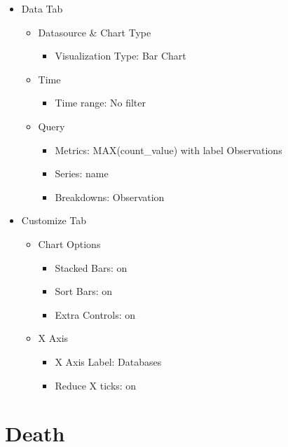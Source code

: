 \documentclass[
]{book}
\providecommand{\tightlist}{%
  \setlength{\itemsep}{0pt}\setlength{\parskip}{0pt}}
\begin{document}
\begin{itemize}
\item
  Data Tab

  \begin{itemize}
  \item
    Datasource \& Chart Type

    \begin{itemize}
    \tightlist
    \item
      Visualization Type: Bar Chart
    \end{itemize}
  \item
    Time

    \begin{itemize}
    \tightlist
    \item
      Time range: No filter
    \end{itemize}
  \item
    Query

    \begin{itemize}
    \item
      Metrics: MAX(count\_value) with label Observations
    \item
      Series: name
    \item
      Breakdowns: Observation
    \end{itemize}
  \end{itemize}
\item
  Customize Tab

  \begin{itemize}
  \item
    Chart Options

    \begin{itemize}
    \item
      Stacked Bars: on
    \item
      Sort Bars: on
    \item
      Extra Controls: on
    \end{itemize}
  \item
    X Axis

    \begin{itemize}
    \item
      X Axis Label: Databases
    \item
      Reduce X ticks: on
    \end{itemize}
  \end{itemize}
\end{itemize}

\hypertarget{death}{%
\chapter{Death}\label{death}}
\end{document}
